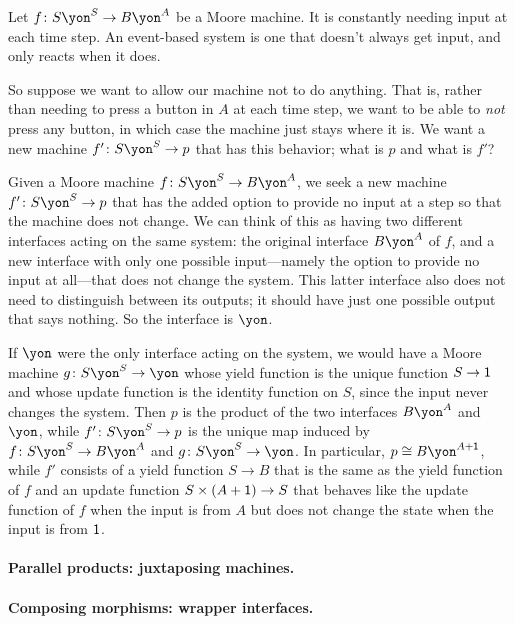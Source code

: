 \documentclass[Book-Poly]{subfiles}
\begin{document}
\begin{exercise}
Let $f\colon S\yon^S\to B\yon^A$ be a Moore machine. It is constantly needing input at each time step. An event-based system is one that doesn't always get input, and only reacts when it does.

So suppose we want to allow our machine not to do anything. That is, rather than needing to press a button in $A$ at each time step, we want to be able to \emph{not} press any button, in which case the machine just stays where it is. We want a new machine $f'\colon S\yon^S\to p$ that has this behavior; what is $p$ and what is $f'$?
\begin{solution}
Given a Moore machine $f\colon S\yon^S\to B\yon^A$, we seek a new machine $f'\colon S\yon^S\to p$ that has the added option to provide no input at a step so that the machine does not change.
We can think of this as having two different interfaces acting on the same system: the original interface $B\yon^A$ of $f$, and a new interface with only one possible input---namely the option to provide no input at all---that does not change the system.
This latter interface also does not need to distinguish between its outputs; it should have just one possible output that says nothing.
So the interface is $\yon$.

If $\yon$ were the only interface acting on the system, we would have a Moore machine $g \colon S\yon^S \to \yon$ whose yield function is the unique function $S \to \textsf{1}$ and whose update function is the identity function on $S$, since the input never changes the system.
Then $p$ is the product of the two interfaces $B\yon^A$ and $\yon$, while $f' \colon S\yon^S \to p$ is the unique map induced by $f \colon S\yon^S \to B\yon^A$ and $g \colon S\yon^S \to \yon$.
In particular, $p \iso B\yon^{A + \1}$, while $f'$ consists of a yield function $S \to B$ that is the same as the yield function of $f$ and an update function $S \times (A + \textsf{1}) \to S$ that behaves like the update function of $f$ when the input is from $A$ but does not change the state when the input is from $\textsf{1}$.
\end{solution}
\end{exercise}

\paragraph{Parallel products: juxtaposing machines.}

\paragraph{Composing morphisms: wrapper interfaces.} %
\end{document}
